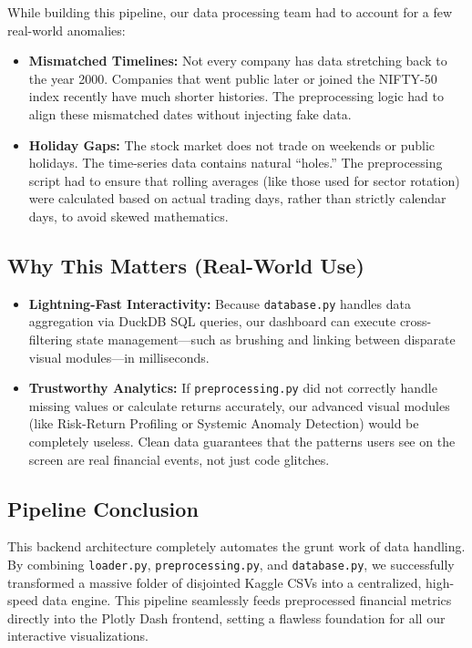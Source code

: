 \documentclass[14pt,a4paper]{extreport}
\begin{document}
While building this pipeline, our data processing team had to account for a
few real-world anomalies:

\begin{itemize}
    \item \textbf{Mismatched Timelines:} Not every company has data
        stretching back to the year 2000. Companies that went public later
        or joined the NIFTY-50 index recently have much shorter histories.
        The preprocessing logic had to align these mismatched dates without
        injecting fake data.
    \item \textbf{Holiday Gaps:} The stock market does not trade on
        weekends or public holidays. The time-series data contains natural
        ``holes.'' The preprocessing script had to ensure that rolling
        averages (like those used for sector rotation) were calculated
        based on actual trading days, rather than strictly calendar days,
        to avoid skewed mathematics.
\end{itemize}

\subsection{Why This Matters (Real-World Use)}

\begin{itemize}
    \item \textbf{Lightning-Fast Interactivity:} Because
        \texttt{database.py} handles data aggregation via DuckDB SQL
        queries, our dashboard can execute cross-filtering state
        management---such as brushing and linking between disparate visual
        modules---in milliseconds.
    \item \textbf{Trustworthy Analytics:} If \texttt{preprocessing.py} did
        not correctly handle missing values or calculate returns
        accurately, our advanced visual modules (like Risk-Return Profiling
        or Systemic Anomaly Detection) would be completely useless. Clean
        data guarantees that the patterns users see on the screen are real
        financial events, not just code glitches.
\end{itemize}

\subsection{Pipeline Conclusion}

This backend architecture completely automates the grunt work of data
handling. By combining \texttt{loader.py}, \texttt{preprocessing.py}, and
\texttt{database.py}, we successfully transformed a massive folder of
disjointed Kaggle CSVs into a centralized, high-speed data engine. This
pipeline seamlessly feeds preprocessed financial metrics directly into the
Plotly Dash frontend, setting a flawless foundation for all our interactive
visualizations.
\end{document}
